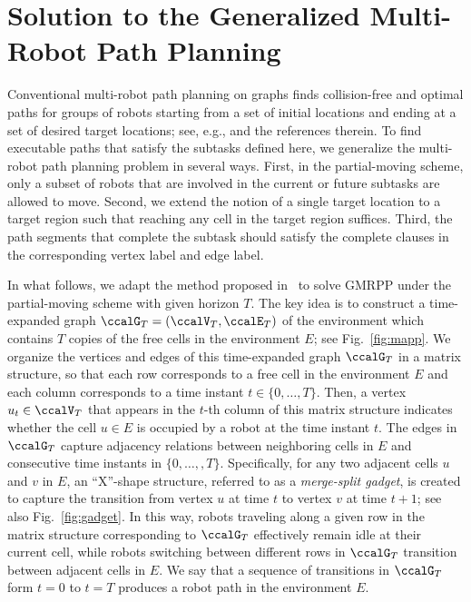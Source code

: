 \documentclass[Afour,sageh,times]{sagej}
\newcommand{\auto}[1]{\ccalA_{\textup{#1}}}
\newcommand{\vertex}[1]{v_{\textup{#1}}}
\begin{document}
{%

\section{Solution to the Generalized Multi-Robot Path Planning}\label{sec:solution2mapp}

{ Conventional multi-robot path planning on graphs finds collision-free and optimal paths for groups of robots starting from a set of initial locations and ending at a set of desired target locations; see, e.g., \cite{yu2016optimal} and the references therein. To find executable paths that satisfy the subtasks defined here, we generalize the multi-robot path planning problem in several ways. First, in the partial-moving scheme,  only a subset of robots that are involved in the current or future subtasks are allowed to move.  Second, we extend the notion of a single target location to a target region such that reaching any cell in the target region suffices. Third, the path segments that complete the  subtask should satisfy the complete clauses in the corresponding vertex label and edge label.


  In what follows, we adapt the method proposed in~\cite{yu2016optimal} to solve GMRPP under the partial-moving scheme with given horizon $T$.  The key idea is to construct a time-expanded graph $\ccalG_T = (\ccalV_T, \ccalE_T)$ of the environment which contains $T$ copies of the free cells in the environment $E$; see Fig.~\ref{fig:mapp}. We organize the vertices and edges of this time-expanded graph $\ccalG_T$ in a matrix structure, so that each row corresponds to a free cell in the environment $E$ and each column corresponds to a time instant $t\in \{0,\ldots,T\}$. Then, a vertex $u_t \in \ccalV_T$ that appears in the $t$-th column of this matrix structure indicates whether the cell $u\in E$ is occupied by a robot at the time instant $t$. The edges in $\ccalG_T$ capture  adjacency relations between neighboring cells in $E$ and consecutive time instants in $\{0,\ldots,,T\}$. Specifically, for any two adjacent cells $u$ and $v$ in $E$, an ``X''-shape structure, referred to as a {\it merge-split gadget}, is created to capture the transition from vertex $u$ at time $t$ to vertex $v$ at time $t+1$; see also Fig.~\ref{fig:gadget}. In this way, robots traveling along a given row in the matrix structure corresponding to $\ccalG_T$ effectively remain idle at their current cell, while robots switching between different rows in $\ccalG_T$ transition between adjacent cells in $E$. We say that a sequence of transitions in $\ccalG_T$ form $t=0$ to $t=T$ produces a robot path in the environment $E$.

}}
\end{document}
